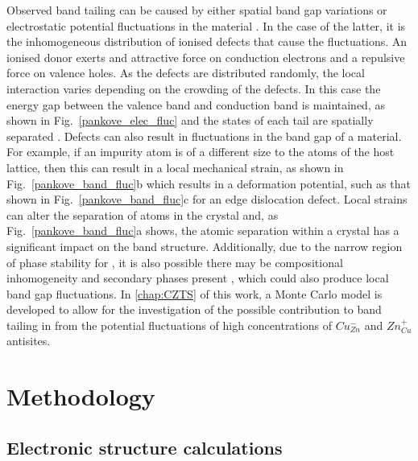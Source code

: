 \documentclass[11pt, twoside]{report}
\begin{document}
Observed band tailing can be caused by either spatial band gap variations or electrostatic potential fluctuations in the material \cite{band_tail}. In the case of the latter, it is the inhomogeneous distribution of ionised defects that cause the fluctuations. An ionised donor exerts and attractive force on conduction electrons and a repulsive force on valence holes. As the defects are distributed randomly, the local interaction varies depending on the crowding of the defects. In this case the energy gap between the valence band and conduction band is maintained, as shown in Fig.~\ref{pankove_elec_fluc} and the states of each tail are spatially separated \cite{Pankove}. Defects can also result in fluctuations in the band gap of a material. For example, if an impurity atom is of a different size to the atoms of the host lattice, then this can result in a local mechanical strain, as shown in Fig.~\ref{pankove_band_fluc}b which results in a deformation potential, such as that shown in Fig.~\ref{pankove_band_fluc}c for an edge dislocation defect. Local strains can alter the separation of atoms in the crystal and, as Fig.~\ref{pankove_band_fluc}a shows, the atomic separation within a crystal has a significant impact on the band structure. Additionally, due to the narrow region of phase stability for {\CZTS}, it is also possible there may be compositional inhomogeneity and secondary phases present \cite{SandS}, which could also produce local band gap fluctuations. 
In \autoref{chap:CZTS} of this work, a Monte Carlo model is developed to allow for the investigation of the possible contribution to band tailing in {\CZTS} from the potential fluctuations of high concentrations of $Cu_{Zn}^{-}$ and $Zn_{Cu}^{+}$ antisites. 


\chapter{Methodology}

\section{Electronic structure calculations}\label{elec_struc}
\end{document}
